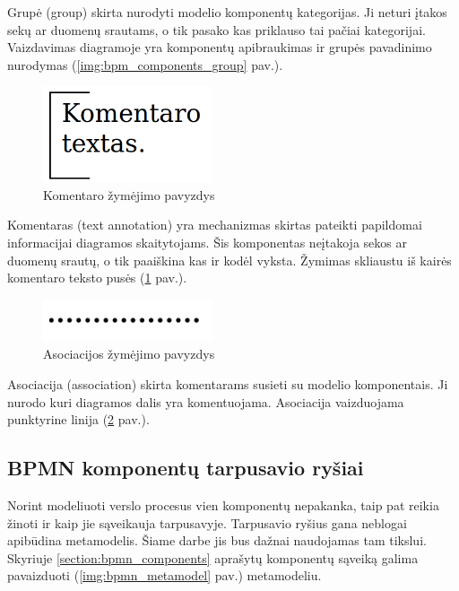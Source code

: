 \documentclass{VUMIFInfBakalaurinis}
\begin{document}
Grupė (group) skirta nurodyti modelio komponentų kategorijas. Ji neturi įtakos sekų ar duomenų srautams, o tik pasako kas priklauso tai pačiai kategorijai. Vaizdavimas diagramoje yra komponentų apibraukimas ir grupės pavadinimo nurodymas (\ref{img:bpm_components_group} pav.).

\begin{figure}[H]
	\centering
	\includegraphics[width=5cm]{img/bpm-components/text_annotation}
	\caption{Komentaro žymėjimo pavyzdys}
	\label{img:bpm_components_text_annotation}
\end{figure}

Komentaras (text annotation) yra mechanizmas skirtas pateikti papildomai informacijai diagramos skaitytojams. Šis komponentas neįtakoja sekos ar duomenų srautų, o tik paaiškina kas ir kodėl vyksta. Žymimas skliaustu iš kairės komentaro teksto pusės (\ref{img:bpm_components_text_annotation} pav.).

\begin{figure}[H]
	\centering
	\includegraphics[width=5cm]{img/bpm-components/association}
	\caption{Asociacijos žymėjimo pavyzdys}
	\label{img:bpm_components_text_association}
\end{figure}

Asociacija (association) skirta komentarams susieti su modelio komponentais. Ji nurodo kuri diagramos dalis yra komentuojama. Asociacija vaizduojama punktyrine linija (\ref{img:bpm_components_text_association} pav.).

\subsection{\textbf{BPMN} komponentų tarpusavio ryšiai}
Norint modeliuoti verslo procesus vien komponentų nepakanka, taip pat reikia žinoti ir kaip jie sąveikauja tarpusavyje. Tarpusavio ryšius gana neblogai apibūdina metamodelis. Šiame darbe jis bus dažnai naudojamas tam tikslui. Skyriuje \ref{section:bpmn_components} aprašytų komponentų sąveiką galima pavaizduoti (\ref{img:bpmn_metamodel} pav.) metamodeliu.
\end{document}
